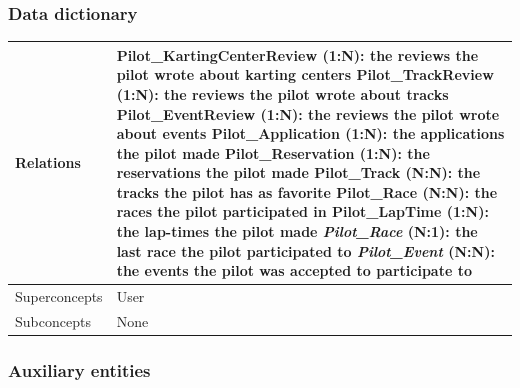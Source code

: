 \documentclass{beamer}
\begin{document}
\begin{frame}
    \frametitle{Data dictionary}
    \begin{table}
    \tiny
    \begin{tabular}{|p{2cm}|p{6cm}|}
    \hline
    Relations &
    Pilot\_KartingCenterReview (1:N): the reviews the pilot wrote about karting centers \newline
    Pilot\_TrackReview (1:N): the reviews the pilot wrote about tracks \newline
    Pilot\_EventReview (1:N): the reviews the pilot wrote about events \newline
    Pilot\_Application (1:N): the applications the pilot made \newline
    Pilot\_Reservation (1:N): the reservations the pilot made \newline
    Pilot\_Track (N:N): the tracks the pilot has as favorite \newline
    Pilot\_Race (N:N): the races the pilot participated in \newline
    Pilot\_LapTime (1:N): the lap-times the pilot made \newline
    \textit{Pilot\_Race} (N:1): the last race the pilot participated to \newline
    \textit{Pilot\_Event} (N:N): the events the pilot was accepted to participate to \\
    \hline
    Superconcepts & User \\
    \hline
    Subconcepts & None \\
    \hline
    \end{tabular}
    \end{table}
\end{frame}

\subsubsection{Auxiliary entities}
\end{document}
